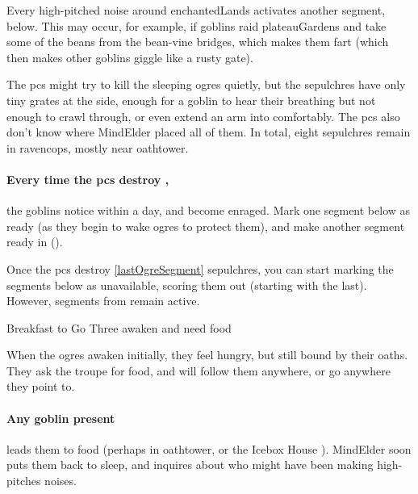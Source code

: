 \begin{multicols}{2}
\label{wakingOgres}

\noindent
Every high-pitched noise around \gls{enchantedLands} activates another \gls{segment}, below.
This may occur, for example, if goblins raid \gls{plateauGardens} and take some of the beans from the bean-vine bridges, which makes them fart (which then makes other goblins giggle like a rusty gate).

The \glspl{pc} might try to kill the sleeping \glspl{ogre} quietly, but the \glspl{sepulchre} have only tiny grates at the side, enough for a goblin to hear their breathing but not enough to crawl through, or even extend an arm into comfortably.
The \glspl{pc} also don't know where \gls{MindElder} placed all of them.
In total, eight \glspl{sepulchre} remain in \gls{ravencops}, mostly near \gls{oathtower}.

\paragraph{Every time the \glspl{pc} destroy ,}
the goblins notice within a day, and become enraged.
Mark one \gls{segment} below as ready (as they begin to wake \glspl{ogre} to protect them), and make another \gls{segment} ready in  ().

Once the \glspl{pc} destroy \ref{lastOgreSegment} \glspl{sepulchre}, you can start marking the \glspl{segment} below as unavailable, scoring them out (starting with the last).
However, \glspl{segment} from  remain active.

\setcounter{segNo}{-1}
{Breakfast to Go}%
{Three  awaken and need food}%

When the \glspl{ogre} awaken initially, they feel hungry, but still bound by their oaths.
They ask the troupe for food, and will follow them anywhere, or go anywhere they point to.


\paragraph{Any goblin present}
leads them to food (perhaps in \gls{oathtower}, or the Icebox House ).
\Gls{MindElder} soon puts them back to sleep, and inquires about who might have been making high-pitches noises.


\end{multicols}

